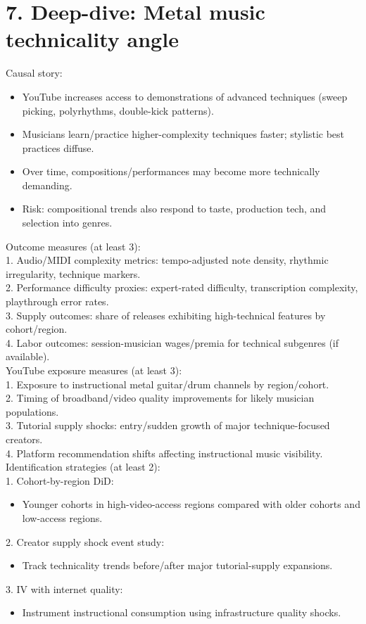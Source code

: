 \documentclass[11pt]{article}
\begin{document}
\section*{7. Deep-dive: Metal music technicality angle}
Causal story:\\
\begin{itemize}
\item YouTube increases access to demonstrations of advanced techniques (sweep picking, polyrhythms, double-kick patterns).
\item Musicians learn/practice higher-complexity techniques faster; stylistic best practices diffuse.
\item Over time, compositions/performances may become more technically demanding.
\item Risk: compositional trends also respond to taste, production tech, and selection into genres.
\end{itemize}

Outcome measures (at least 3):\\
1. Audio/MIDI complexity metrics: tempo-adjusted note density, rhythmic irregularity, technique markers.\\
2. Performance difficulty proxies: expert-rated difficulty, transcription complexity, playthrough error rates.\\
3. Supply outcomes: share of releases exhibiting high-technical features by cohort/region.\\
4. Labor outcomes: session-musician wages/premia for technical subgenres (if available).\\

YouTube exposure measures (at least 3):\\
1. Exposure to instructional metal guitar/drum channels by region/cohort.\\
2. Timing of broadband/video quality improvements for likely musician populations.\\
3. Tutorial supply shocks: entry/sudden growth of major technique-focused creators.\\
4. Platform recommendation shifts affecting instructional music visibility.\\

Identification strategies (at least 2):\\
1. Cohort-by-region DiD:\\
\begin{itemize}
\item Younger cohorts in high-video-access regions compared with older cohorts and low-access regions.
\end{itemize}
2. Creator supply shock event study:\\
\begin{itemize}
\item Track technicality trends before/after major tutorial-supply expansions.
\end{itemize}
3. IV with internet quality:\\
\begin{itemize}
\item Instrument instructional consumption using infrastructure quality shocks.
\end{itemize}
\end{document}
